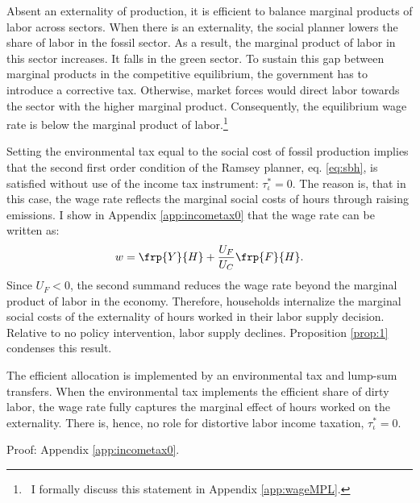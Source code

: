 Absent an externality of production, it is efficient to balance marginal products of labor across sectors.
When there is an externality, the social planner lowers the share of labor in the fossil sector. As a result, the marginal product of labor in this sector increases. It falls in the green sector. To sustain this gap between marginal products in the competitive equilibrium, the government has to introduce a corrective tax. Otherwise, market forces would direct labor towards the sector with the higher marginal product. Consequently, the equilibrium wage rate is below the marginal product of labor.\footnote{\ I formally discuss this statement in Appendix \ref{app:wageMPL}.} 

Setting the environmental tax equal to the social cost of fossil production implies that the second first order condition of the Ramsey planner, eq. \eqref{eq:sbh}, is satisfied without use of the income tax instrument: $\tau_{\iota}^*=0$. 
The reason is, that in this case, the wage rate reflects the marginal social costs of hours through raising emissions. I show in Appendix \ref{app:incometax0} that the wage rate can be written as:
\begin{align*}
w = \frp{Y}{H}+\frac{U_F}{U_C}\frp{F}{H}.
\end{align*}
Since $U_F<0$, the second summand reduces the wage rate beyond the marginal product of labor in the economy.
Therefore, households internalize the marginal social costs of the externality of hours worked in their labor supply decision. Relative to no policy intervention, labor supply declines. Proposition \ref{prop:1} condenses this result.

\newpage 
\begin{prop}\label{prop:1}
	The efficient allocation is implemented by an environmental tax and lump-sum transfers.  When the environmental tax implements the efficient share of dirty labor, the wage rate fully captures the marginal effect of hours worked on the externality. There is, hence, no role for distortive labor income taxation, $\tau_{\iota}^*=0$.
\end{prop}
Proof: Appendix \ref{app:incometax0}. 




